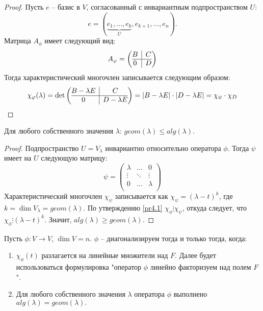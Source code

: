 \begin{proof}
    Пусть $e$ -- базис в $V$, согласованный с инвариантным подпространством $U$: 
    $$e = (\underbrace{e_{1}, \dots, e_{k}}_{U}, e_{k + 1}, \dots, e_n).$$
    Матрица $A_{\phi}$ имеет следующий вид:
    \[A_{\phi} = \left(\begin{array}{@{}c|c@{}}
		B & C\\
		\hline
		0 & D
    \end{array}\right)\]
    Тогда характеристический многочлен записывается следующим образом:
    \[\chi_{\phi}(\lambda) = \det \left(\begin{array}{@{}c|c@{}}
		B - \lambda E & C\\
		\hline
		0 & D - \lambda E
    \end{array}\right) = |B - \lambda E| \cdot |D - \lambda E| = \chi_{\psi} \cdot \chi_D\]
\end{proof}

\begin{corollary}
    Для любого собственного значения $\lambda$: $geom(\lambda) \leq alg(\lambda)$.
\end{corollary}

\begin{proof}
    Подпространство $U = V_{\lambda}$ инвариантно относительно оператора $\phi$. Тогда $\psi$ имеет 
    на $U$ следующую матрицу:
    \begin{equation*}
    \psi =
        \left(
            \begin{array}{ccc}
            \lambda & \dots & 0 \\
            \vdots & \ddots & \vdots \\
            0 & \dots & \lambda \\
            \end{array}
        \right)
    \end{equation*}
    Характеристический многочлен $\chi_{\psi}$ записывается как 
    $\chi_{\psi} = (\lambda - t)^k$, где $k = \dim V_{\lambda} = geom(\lambda)$. 
    По утверждению \ref{pr4.1} $\chi_{\phi} \vdots \chi_{\psi}$, откуда следует, что 
    $\chi_{\phi} \vdots (\lambda - t)^k$. Значит, $alg(\lambda) \geq geom(\lambda)$.
\end{proof}

\begin{theorem}
    Пусть $\phi: V \to V$, $\dim V = n$. $\phi$ -- диагонализируем тогда и только тогда, когда: 
    \begin{enumerate}
        \item $\chi_{\phi}(t)$ разлагается на линейные множители над $F$. Далее будет использоваться 
        формулировка "оператор $\phi$ линейно факторизуем над полем $F$".
        \item Для любого собственного значения $\lambda$ оператора $\phi$ выполнено $alg(\lambda) = geom(\lambda).$
    \end{enumerate}
\end{theorem}

